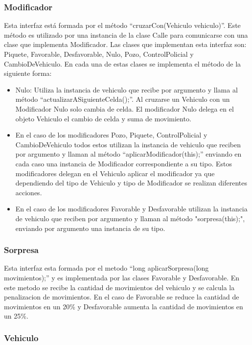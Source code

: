 \documentclass[titlepage,a4paper]{article}
\begin{document}
\subsubsection[Modificador]{Modificador}

Esta interfaz está formada por el método “cruzarCon(Vehiculo vehiculo)”. Este método es utilizado por una instancia de la clase Calle para comunicarse con una clase que implementa Modificador.
Las clases que implementan esta interfaz son: Piquete, Favorable, Desfavorable, Nulo, Pozo, ControlPolicial y CambioDeVehiculo. En cada una de estas clases se implementa el método de la siguiente forma:

\begin{itemize}
  \item Nulo: Utiliza la instancia de vehiculo que recibe por argumento y llama al método “actualizarASiguienteCelda();”. Al cruzarse un Vehiculo con un Modificador Nulo solo cambia de celda. El modificador Nulo delega en el objeto Vehiculo el cambio de celda y suma de movimiento.
  \item En el caso de los modificadores Pozo, Piquete, ControlPolicial y CambioDeVehiculo todos estos utilizan la instancia de vehiculo que reciben por argumento y llaman al método “aplicarModificador(this);” enviando en cada caso una instancia de Modificador correspondiente a su tipo. Estos modificadores delegan en el Vehiculo aplicar el modificador ya que dependiendo del tipo de Vehiculo y tipo de Modificador se realizan diferentes acciones.
  \item En el caso de los modificadores Favorable y Desfavorable utilizan la instancia de vehiculo que reciben por argumento y llaman al método "sorpresa(this);", enviando por argumento una instancia de su tipo.
\end{itemize}
\subsubsection[Sorpresa]{Sorpresa}

Esta interfaz esta formada por el metodo  “long aplicarSorpresa(long movimientos);”  y es implementada por las clases Favorable y Desfavorable.
En este metodo se recibe la cantidad de movimientos del vehiculo y se calcula la penalizacion de movimientos. En el caso de Favorable se reduce la cantidad de movimientos en un 20\% y Desfavorable aumenta la cantidad de movimientos en un 25\%.

\subsubsection[Vehiculo]{Vehiculo}
\end{document}
